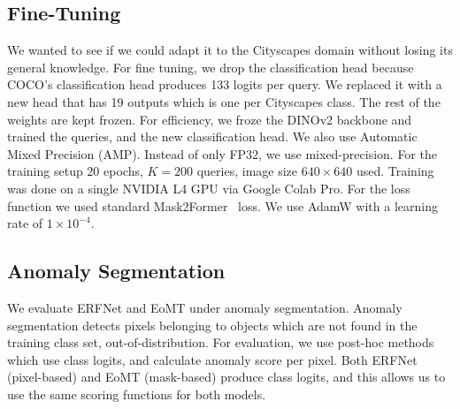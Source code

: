 \subsection{Fine-Tuning} 
We wanted to see if we could adapt it to the Cityscapes domain without losing its general knowledge.
For fine tuning, we drop the classification head because COCO's classification head produces 133 logits per query. We replaced it with a new head that has 19 outputs which is one per Cityscapes class.
The rest of the weights are kept frozen.
For efficiency, we froze the DINOv2 backbone and trained the queries, and the new classification head. 
We also use Automatic Mixed Precision (AMP). Instead of only FP32, we use mixed-precision.
For the training setup $20$ epochs, $K=200$ queries, image size $640{\times}640$ used. 
Training was done on a single NVIDIA L4 GPU via Google Colab Pro.
For the loss function we used standard Mask2Former~\cite{mask2former} loss.
We use AdamW with a learning rate of $1\times10^{-4}$.

\subsection{Anomaly Segmentation}
We evaluate ERFNet and EoMT under anomaly segmentation.
Anomaly segmentation detects pixels belonging to objects which are not found in the training class set, out-of-distribution.
For evaluation, we use post-hoc methods which use class logits, and calculate anomaly score per pixel. 
Both ERFNet (pixel-based) and EoMT (mask-based) produce class logits, and this allows us to use the same scoring functions for both models.
